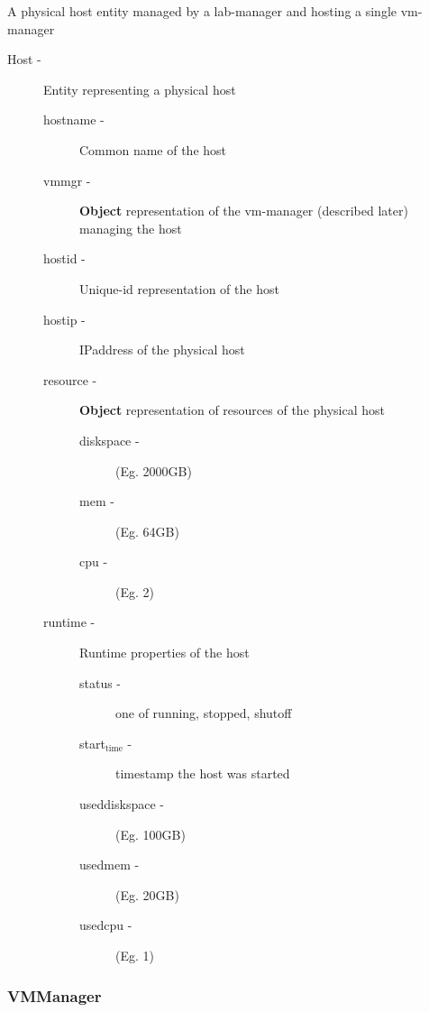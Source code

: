 \documentclass[11pt]{article}
\begin{document}
     A physical host entity managed by a lab-manager and hosting a single vm-manager
\begin{description}
\item [Host -] Entity representing a physical host

\begin{description}
\item [hostname -] Common name of the host
\item [vmmgr -] \textbf{Object} representation of the vm-manager
                         (described later) managing the host
\item [hostid -] Unique-id representation of the host
\item [hostip -] IPaddress of the physical host
\item [resource -]  \textbf{Object} representation of resources of the physical host

\begin{description}
\item [diskspace -] (Eg. 2000GB)
\item [mem -] (Eg. 64GB)
\item [cpu -] (Eg. 2)
\end{description}

\item [runtime -] Runtime properties of the host

\begin{description}
\item [status -] one of running, stopped, shutoff
\item [start$_{\mathrm{time}}$ -] timestamp the host was started
\item [useddiskspace -] (Eg. 100GB)
\item [usedmem -] (Eg. 20GB)
\item [usedcpu -] (Eg. 1)
\end{description}

\end{description}

\end{description}
\subsubsection{VMManager}
\label{sec-3.3.5}
\end{document}
